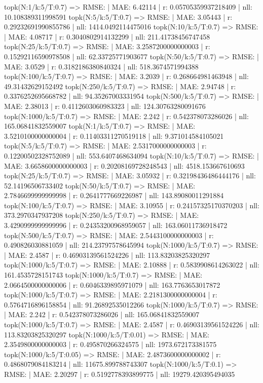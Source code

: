 topk(N:1/k:5/T:0.7) => RMSE: | MAE: 6.42114 | r: 0.05705359937218409 | nll: 10.108389311998591
topk(N:5/k:5/T:0.7) => RMSE: | MAE: 3.05443 | r: 0.29232691990855786 | nll: 1414.0492114475016
topk(N:10/k:5/T:0.7) => RMSE: | MAE: 4.08717 | r: 0.3040802914132299 | nll: 211.41738456747458
topk(N:25/k:5/T:0.7) => RMSE: | MAE: 3.2587200000000003 | r: 0.15292116590978508 | nll: 62.33725771903677
topk(N:50/k:5/T:0.7) => RMSE: | MAE: 3.0529 | r: 0.3182186380840324 | nll: 518.3674571994388
topk(N:100/k:5/T:0.7) => RMSE: | MAE: 3.2039 | r: 0.268664981463948 | nll: 49.31432629152492
topk(N:250/k:5/T:0.7) => RMSE: | MAE: 2.94748 | r: 0.3376252695668782 | nll: 94.35267003331954
topk(N:500/k:5/T:0.7) => RMSE: | MAE: 2.38013 | r: 0.4112603060983323 | nll: 124.30763280091676
topk(N:1000/k:5/T:0.7) => RMSE: | MAE: 2.242 | r: 0.542378073286026 | nll: 165.06841832559007
topk(N:1/k:5/T:0.7) => RMSE: | MAE: 3.5210100000000004 | r: 0.11403311270519118 | nll: 9.371014584105021
topk(N:5/k:5/T:0.7) => RMSE: | MAE: 2.5317000000000003 | r: 0.12200502328752089 | nll: 553.6407468634094
topk(N:10/k:5/T:0.7) => RMSE: | MAE: 3.6658600000000003 | r: 0.20208169728248543 | nll: 4518.153667610693
topk(N:25/k:5/T:0.7) => RMSE: | MAE: 3.05932 | r: 0.32198436486444176 | nll: 52.14196506733402
topk(N:50/k:5/T:0.7) => RMSE: | MAE: 2.7846699999999998 | r: 0.2641777669226987 | nll: 143.89080011291884
topk(N:100/k:5/T:0.7) => RMSE: | MAE: 3.10955 | r: 0.24157325170370203 | nll: 373.2970347937208
topk(N:250/k:5/T:0.7) => RMSE: | MAE: 3.4290999999999996 | r: 0.24353200968959057 | nll: 163.06011736918472
topk(N:500/k:5/T:0.7) => RMSE: | MAE: 2.5443100000000003 | r: 0.490826030881059 | nll: 214.23797578645994
topk(N:1000/k:5/T:0.7) => RMSE: | MAE: 2.4587 | r: 0.46903139561524226 | nll: 113.83203825320297
topk(N:1000/k:5/T:0.7) => RMSE: | MAE: 2.10888 | r: 0.5839908614263022 | nll: 161.4535728151743
topk(N:1000/k:5/T:0.7) => RMSE: | MAE: 2.0664500000000006 | r: 0.6046339895971079 | nll: 163.7763653017872
topk(N:1000/k:5/T:0.7) => RMSE: | MAE: 2.2181300000000004 | r: 0.5764716896158854 | nll: 91.26892535012266
topk(N:1000/k:5/T:0.7) => RMSE: | MAE: 2.242 | r: 0.542378073286026 | nll: 165.06841832559007
topk(N:1000/k:5/T:0.7) => RMSE: | MAE: 2.4587 | r: 0.46903139561524226 | nll: 113.83203825320297
topk(N:1000/k:5/T:0.01) => RMSE: | MAE: 2.3549800000000003 | r: 0.495870266324575 | nll: 1973.672173381575
topk(N:1000/k:5/T:0.05) => RMSE: | MAE: 2.4873600000000002 | r: 0.4868079084183214 | nll: 11675.899788743307
topk(N:1000/k:5/T:0.1) => RMSE: | MAE: 2.20297 | r: 0.5192778393899775 | nll: 19279.420395494035
